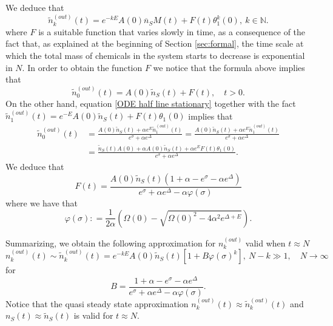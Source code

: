 \documentclass{article}
\numberwithin{equation}{section}
\theoremstyle{plain}
\begin{document}
We deduce that
\[
 \tilde{n}_k^{(out)}(t) = e^{- k E } A(0)  \overline n_S M(t)  + F(t) \theta_1^k(0),\  k \in \mathbb N. 
\]
where $F$ is a suitable function that varies slowly in time, as a consequence of the fact that, as explained at the beginning of Section \ref{sec:formal}, the time scale at which the total mass of chemicals in the system starts to decrease is exponential in $N$. 
In order to obtain the function $F$ we notice that the formula above implies that
\[
 \tilde{n}_0^{(out)}(t) =  A(0)  \tilde{n}_S(t)    + F(t),  \quad t>0. 
\]
On the other hand, equation \eqref{ODE half line stationary} together with the fact $  \tilde{n}_1^{(out)}(t) =e^{- E } A(0)    \tilde{n}_S(t)  + F(t) \theta_1(0)$  implies that
\begin{align*}
 \tilde{n}_0^{(out) } (t) &= \frac{ A (0)  \tilde{n}_S(t)+ \alpha e^E  \tilde{n}_1^{(out)}(t) }{e^\sigma + \alpha e^\Delta } = \frac{ A(0)  \tilde{n}_S(t) + \alpha e^E  \tilde{n}_1^{(out)} (t)}{e^\sigma + \alpha e^\Delta } \\
&= \frac{ \tilde{n}_S(t) A(0) + \alpha A(0)  \tilde{n}_S(t) + \alpha e^E F(t) \theta_1(0)  }{e^\sigma + \alpha e^\Delta }. 
\end{align*}
We deduce that
\[
F(t)= \frac{A(0)   \tilde{n}_S(t) (1+\alpha - e^\sigma - \alpha e^\Delta )  }{ e^\sigma + \alpha e^\Delta - \alpha \varphi (\sigma )}
\]
where  we have that 
\begin{equation} \label{varphi}
\varphi(\sigma): = \frac{1}{2 \alpha } \left( \Omega(0)  - \sqrt{ \Omega(0)^2- 4 \alpha^2 e^{\Delta + E }} \right). 
\end{equation}

Summarizing, we obtain the following approximation for $n_k^{(out)} $ valid when $t \approx N $
\begin{equation} \label{asymptotic}
n_k^{(out)} (t)  \sim \tilde{n}_k^{(out)} (t) = e^{- k E } A(0) \tilde{n}_S(t)  \left[ 1 + B \varphi(\sigma)^k \right],\  N- k \gg 1 , \quad  N \to \infty 
\end{equation}
for 
\begin{equation} \label{B} B= \frac{ 1+\alpha - e^\sigma - \alpha e^\Delta  }{ e^\sigma + \alpha e^\Delta - \alpha \varphi(\sigma) }.
\end{equation}
Notice that the quasi steady state approximation $n_k^{(out)} (t)  \approx \tilde{n}_k^{(out)} (t)$ and $n_S(t) \approx \tilde{n}_S (t) $ is valid for $t \approx N $. 
\end{document}
